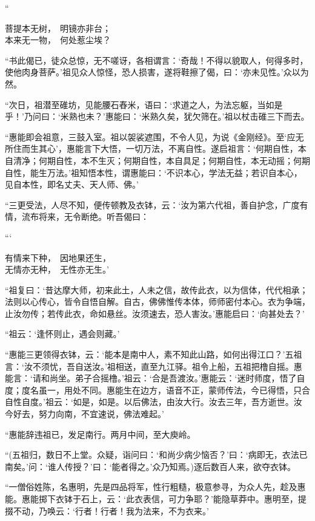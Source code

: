 \documentclass[UTF8, 11pt, oneside]{ctexart}
\newenvironment{jizi}[1]{
    \vspace{-1em}\begin{center}
        #1%
        \begin{varwidth}[t]{\linewidth}
}{
        \end{varwidth}
    \end{center}
}
\begin{document}
\begin{jizi}{“}
    菩提本无树，　明镜亦非台； \\
    本来无一物，　何处惹尘埃？
\end{jizi}

“书此偈已，徒众总惊，无不嗟讶，各相谓言：‘奇哉！不得以貌取人，何得多时，使他肉身菩萨。’祖见众人惊怪，恐人损害，遂将鞋擦了偈，曰：‘亦未见性。’众以为然。

“次日，祖潜至碓坊，见能腰石舂米，语曰：‘求道之人，为法忘躯，当如是乎！’乃问曰：‘米熟也未？’惠能曰：‘米熟久矣，犹欠筛在。’祖以杖击碓三下而去。

“惠能即会祖意，三鼓入室。祖以袈裟遮围，不令人见，为说《金刚经》。至‘应无所住而生其心’，惠能言下大悟，一切万法，不离自性。遂启祖言：‘何期自性，本自清净；何期自性，本不生灭；何期自性，本自具足；何期自性，本无动摇；何期自性，能生万法。’祖知悟本性，谓惠能曰：‘不识本心，学法无益；若识自本心，见自本性，即名丈夫、天人师、佛。’

“三更受法，人尽不知，便传顿教及衣钵，云：‘汝为第六代祖，善自护念，广度有情，流布将来，无令断绝。听吾偈曰：

\begin{jizi}{“‘}
    有情来下种，　因地果还生， \\
    无情亦无种，　无性亦无生。’
\end{jizi}

“祖复曰：‘昔达摩大师，初来此土，人未之信，故传此衣，以为信体，代代相承；法则以心传心，皆令自悟自解。自古，佛佛惟传本体，师师密付本心。衣为争端，止汝勿传；若传此衣，命如悬丝。汝须速去，恐人害汝。’惠能启曰：‘向甚处去？’

“祖云：‘逢怀则止，遇会则藏。’

“惠能三更领得衣钵，云：‘能本是南中人，素不知此山路，如何出得江口？’五祖言：‘汝不须忧，吾自送汝。’祖相送，直至九江驿。祖令上船，五祖把橹自摇。惠能言：‘请和尚坐。弟子合摇橹。’祖云：‘合是吾渡汝。’惠能云：‘迷时师度，悟了自度；度名虽一，用处不同。惠能生在边方，语音不正，蒙师传法，今已得悟，只合自性自度。’祖云：‘如是，如是。以后佛法，由汝大行。汝去三年，吾方逝世。汝今好去，努力向南，不宜速说，佛法难起。’

“惠能辞违祖已，发足南行。两月中间，至大庾岭。

“(五祖归，数日不上堂。众疑，诣问曰：‘和尚少病少恼否？’曰：‘病即无，衣法已南矣。’问：‘谁人传授？’曰：‘能者得之。’众乃知焉。)逐后数百人来，欲夺衣钵。

“一僧俗姓陈，名惠明，先是四品将军，性行粗糙，极意参寻，为众人先，趁及惠能。惠能掷下衣钵于石上，云：‘此衣表信，可力争耶？’能隐草莽中。惠明至，提掇不动，乃唤云：‘行者！行者！我为法来，不为衣来。’
\end{document}
